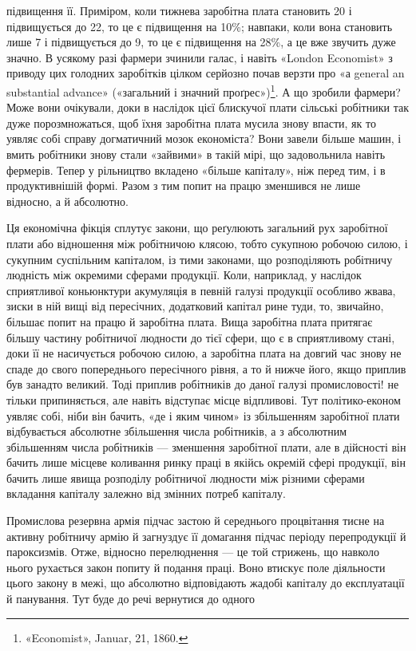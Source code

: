 \parcont{}  %
підвищення її. Приміром, коли тижнева заробітна плата становить
20 і підвищується до 22, то це є підвищення
на 10\%; навпаки, коли вона становить лише 7
і підвищується до 9, то це є підвищення на 28\%, а це вже
звучить дуже значно. В усякому разі фармери зчинили галас,
і навіть «London Economist» з приводу цих голодних заробітків
цілком серйозно почав верзти про «а general an substantial
advance» («загальний і значний проґрес»)\footnote{
«Economist», Januar, 21, 1860.
}. А що зробили
фармери? Може вони очікували, доки в наслідок цієї блискучої
плати сільські робітники так дуже порозмножаться, щоб їхня
заробітна плата мусила знову впасти, як то уявляє собі справу
догматичний мозок економіста? Вони завели більше машин,
і вмить робітники знову стали «зайвими» в такій мірі, що задовольнила
навіть фермерів. Тепер у рільництво вкладено
«більше капіталу», ніж перед тим, і в продуктивнішій формі.
Разом з тим попит на працю зменшився не лише відносно,
а й абсолютно.

Ця економічна фікція сплутує закони, що реґулюють загальний
рух заробітної плати або відношення між робітничою клясою,
тобто сукупною робочою силою, і сукупним суспільним капіталом,
із тими законами, що розподіляють робітничу людність
між окремими сферами продукції. Коли, наприклад, у наслідок
сприятливої коньюнктури акумуляція в певній галузі продукції
особливо жвава, зиски в ній вищі від пересічних, додатковий
капітал рине туди, то, звичайно, більшає попит на працю й заробітна
плата. Вища заробітна плата притягає більшу частину
робітничої людности до тієї сфери, що є в сприятливому стані,
доки її не насичується робочою силою, а заробітна плата на довгий
час знову не спаде до свого попереднього пересічного рівня,
а то й нижче його, якщо приплив був занадто великий. Тоді
приплив робітників до даної галузі промисловості! не тільки
припиняється, але навіть відступає місце відпливові. Тут політико-економ
уявляє собі, ніби він бачить, «де і яким чином»
із збільшенням заробітної плати відбувається абсолютне збільшення
числа робітників, а з абсолютним збільшенням числа робітників
— зменшення заробітної плати, але в дійсності він бачить
лише місцеве коливання ринку праці в якійсь окремій сфері
продукції, він бачить лише явища розподілу робітничої людности
між різними сферами вкладання капіталу залежно від змінних
потреб капіталу.

Промислова резервна армія підчас застою й середнього процвітання
тисне на активну робітничу армію й загнуздує її домагання
підчас періоду перепродукції й пароксизмів. Отже, відносно
перелюднення — це той стрижень, що навколо нього рухається
закон попиту й подання праці. Воно втискує поле діяльности
цього закону в межі, що абсолютно відповідають жадобі капіталу
до експлуатації й панування. Тут буде до речі вернутися до одного
\parbreak{}  %
